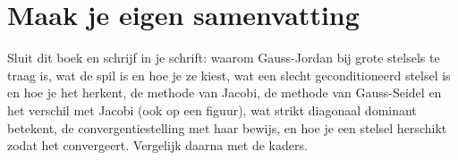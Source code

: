 
\begin{oefeningen}


\end{oefeningen}


\begin{oefeningen}






\end{oefeningen}


\ifzelfstudie
\section*{Maak je eigen samenvatting}
Sluit dit boek en schrijf in je schrift: waarom Gauss-Jordan bij grote stelsels te traag is, wat de spil is en hoe je ze kiest, wat een slecht geconditioneerd stelsel is en hoe je het herkent, de methode van Jacobi, de methode van Gauss-Seidel en het verschil met Jacobi (ook op een figuur), wat strikt diagonaal dominant betekent, de convergentiestelling met haar bewijs, en hoe je een stelsel herschikt zodat het convergeert. Vergelijk daarna met de kaders.
\fi
